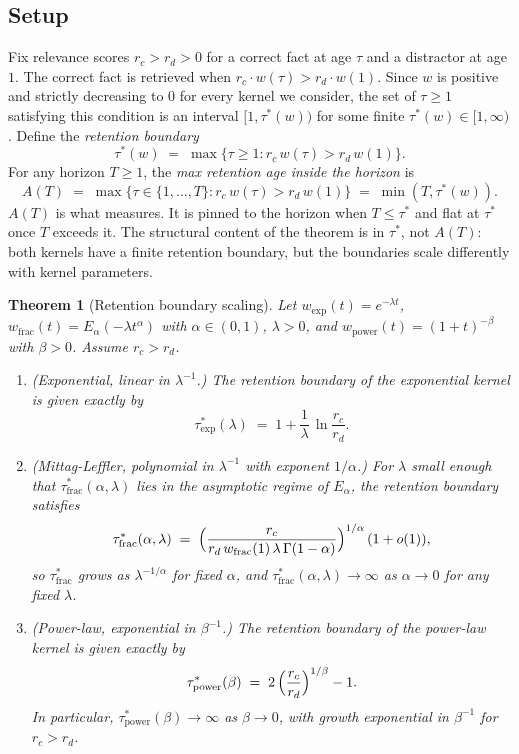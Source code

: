 \documentclass[11pt]{article}
\theoremstyle{plain}
\newtheorem{theorem}{Theorem}[section]
\theoremstyle{definition}
\begin{document}
\subsection{Setup}

Fix relevance scores $r_c > r_d > 0$ for a correct
fact at age $\tau$ and a distractor at age $1$.  The
correct fact is retrieved when
$r_c \cdot w(\tau) > r_d \cdot w(1)$.  Since $w$ is
positive and strictly decreasing to $0$ for every
kernel we consider, the set of $\tau \geq 1$
satisfying this condition is an interval
$[1, \tau^*(w))$ for some finite
$\tau^*(w) \in [1, \infty)$.  Define the
\emph{retention boundary}
\[
\tau^*(w) \;=\; \max \big\{ \tau \geq 1
  : r_c\,w(\tau) > r_d\,w(1) \big\}.
\]
For any horizon $T \geq 1$, the \emph{max retention
age inside the horizon} is
\[
A(T) \;=\; \max \big\{ \tau \in \{1, \ldots, T\}
  : r_c\,w(\tau) > r_d\,w(1) \big\} \;=\; \min(T,
  \tau^*(w)).
\]
$A(T)$ is what  measures.  It is
pinned to the horizon when $T \leq \tau^*$ and flat at
$\tau^*$ once $T$ exceeds it.  The structural content
of the theorem is in $\tau^*$, not $A(T)$: both
kernels have a finite retention boundary, but the
boundaries scale differently with kernel parameters.

\begin{theorem}[Retention boundary scaling]
\label{thm:retention}
Let $w_{\mathrm{exp}}(t) = e^{-\lambda t}$,
$w_{\mathrm{frac}}(t) = E_\alpha(-\lambda t^\alpha)$
with $\alpha \in (0, 1)$, $\lambda > 0$, and
$w_{\mathrm{power}}(t) = (1+t)^{-\beta}$ with
$\beta > 0$.  Assume $r_c > r_d$.
\begin{enumerate}
\item \textnormal{(Exponential, linear in
  $\lambda^{-1}$.)}  The retention boundary of the
  exponential kernel is given exactly by
  \[
  \tau^*_{\mathrm{exp}}(\lambda)
  \;=\; 1 + \frac{1}{\lambda}\,
    \ln\!\frac{r_c}{r_d}.
  \]

\item \textnormal{(Mittag-Leffler, polynomial in
  $\lambda^{-1}$ with exponent $1/\alpha$.)}  For
  $\lambda$ small enough that
  $\tau^*_{\mathrm{frac}}(\alpha, \lambda)$ lies in
  the asymptotic regime of $E_\alpha$, the retention
  boundary satisfies
  \[
  \tau^*_{\mathrm{frac}}(\alpha, \lambda)
  \;=\; \Bigl(\frac{r_c}
    {r_d\,w_{\mathrm{frac}}(1)\,\lambda\,
    \Gamma(1-\alpha)}\Bigr)^{1/\alpha}
    \,(1 + o(1)),
  \]
  so $\tau^*_{\mathrm{frac}}$ grows as
  $\lambda^{-1/\alpha}$ for fixed $\alpha$, and
  $\tau^*_{\mathrm{frac}}(\alpha, \lambda) \to
  \infty$ as $\alpha \to 0$ for any fixed $\lambda$.

\item \textnormal{(Power-law, exponential in
  $\beta^{-1}$.)}  The retention boundary of the
  power-law kernel is given exactly by
  \[
  \tau^*_{\mathrm{power}}(\beta)
  \;=\; 2\,\Bigl(\frac{r_c}{r_d}\Bigr)^{1/\beta}
    - 1.
  \]
  In particular, $\tau^*_{\mathrm{power}}(\beta) \to
  \infty$ as $\beta \to 0$, with growth exponential
  in $\beta^{-1}$ for $r_c > r_d$.
\end{enumerate}
\end{theorem}
\end{document}
